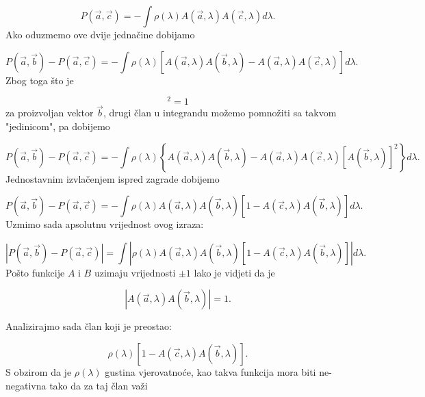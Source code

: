 \begin{equation}
    P(\vec{a}, \vec{c}) = - \int \rho (\lambda) A(\vec{a}, \lambda) A(\vec{c}, \lambda) d\lambda.
\end{equation}
Ako oduzmemo ove dvije jednačine dobijamo

\begin{equation}
    P(\vec{a}, \vec{b}) - P(\vec{a}, \vec{c})  = - \int \rho (\lambda) [A(\vec{a}, \lambda) A(\vec{b}, \lambda) - A(\vec{a}, \lambda) A(\vec{c}, \lambda) ] d\lambda.
\end{equation}
Zbog toga što je

\begin{equation}
    [A(\vec{b}, \lambda)]^2 = 1
\end{equation}
za proizvoljan vektor $\vec{b}$, drugi član u integrandu možemo pomnožiti sa takvom "jedinicom", pa dobijemo

\begin{equation}
    P(\vec{a}, \vec{b}) - P(\vec{a}, \vec{c})  = - \int \rho (\lambda) \left\{A(\vec{a}, \lambda) A(\vec{b}, \lambda) - A(\vec{a}, \lambda) A(\vec{c}, \lambda)[A(\vec{b}, \lambda)]^2 \right\}d\lambda.
\end{equation}
Jednostavnim izvlačenjem ispred zagrade dobijemo

\begin{equation}
    P(\vec{a}, \vec{b}) - P(\vec{a}, \vec{c})  = - \int \rho (\lambda) A(\vec{a}, \lambda) A(\vec{b}, \lambda) [1- A(\vec{c}, \lambda) A(\vec{b}, \lambda) ] d\lambda.
\end{equation}
Uzmimo sada apsolutnu vrijednost ovog izraza:

\begin{equation}
    \left|{P(\vec{a}, \vec{b}) - P(\vec{a}, \vec{c})}\right| =  \int \left| \rho (\lambda) A(\vec{a}, \lambda) A(\vec{b}, \lambda) [1- A(\vec{c}, \lambda) A(\vec{b}, \lambda)  ] \right| d\lambda.
\end{equation}
Pošto funkcije $A$ i $B$ uzimaju vrijednosti $\pm 1$ lako je vidjeti da je

\begin{equation}
    \left|A(\vec{a}, \lambda) A(\vec{b}, \lambda)\right| = 1.
\end{equation}

Analizirajmo sada član koji je preostao:

\begin{equation}
    \rho (\lambda)[1 - A(\vec{c}, \lambda) A(\vec{b}, \lambda) ].
\end{equation}
S obzirom da je $\rho(\lambda)$ gustina vjerovatnoće, kao takva funkcija mora biti ne-negativna tako da za taj član važi

